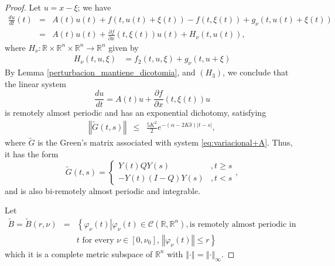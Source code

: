\documentclass[english,reqno]{amsart}
\numberwithin{equation}{section}
\theoremstyle{plain}
\theoremstyle{definition}
\theoremstyle{remark}
\begin{document}
\begin{proof}
Let $u=x-\xi$; we have
\begin{eqnarray}
\frac{du}{dt}\left(t\right) & = & A\left(t\right)u\left(t\right)+f\left(t,u\left(t\right)+\xi\left(t\right)\right)-f\left(t,\xi\left(t\right)\right)+ g_{\nu}\left(t,u\left(t\right)+\xi\left(t\right)\right) \label{traslado_Lipschitz} \\
 & = & A\left(t\right)u\left(t\right)+\frac{\partial f}{\partial x}\left(t,\xi\left(t\right)\right)u\left(t\right)+H_{\nu}\left(t,u\left(t\right)\right),\label{eq:trasladoentornovarphi0}
\end{eqnarray}
where $H_{\nu}:\mathbb{R}\times\mathbb{R}^n\times\mathbb{R}^n\rightarrow\mathbb{R}^n$ given by
\begin{align}
H_{\nu}\left(t,u,\xi\right) & = f_{2}\left(t,u,\xi\right)+ g_{\nu}\left(t,
u+\xi\right)\label{eq:H_v}
\end{align}
By Lemma \ref{perturbacion_mantiene_dicotomia}, and $\left(H_{3}\right)$, we conclude that the linear system 
\begin{equation}
\frac{du}{dt}=A\left(t\right)u+\frac{\partial f}{\partial x}\left(t,\xi\left(t\right)\right)u\label{eq:variacional+A}
\end{equation}
is remotely almost periodic and has an exponential dichotomy, satisfying
\begin{eqnarray*}
\left\Vert \tilde{G}\left(t,s\right)\right\Vert  & \leq & \frac{5K^{2}}{2}e^{-\left(\alpha-2K\delta\right)\left|t-s\right|},
\end{eqnarray*}
where $\tilde{G}$  is the Green's matrix associated with system \eqref{eq:variacional+A}. Thus, it has the form
\[
\tilde{G}\left(t,s\right)=\begin{cases}
Y\left(t\right)QY\left(s\right) & ,t\geq s\\
-Y\left(t\right)\left(I-Q\right)Y\left(s\right) & ,t< s
\end{cases},
\]
and is also bi-remotely almost periodic and integrable.

Let 
\begin{eqnarray*}
\widetilde{B}=\widetilde{B}\left(r,\nu\right) & = & \left\{ \varphi_{\nu}\left(t\right)\left|\varphi_{\nu}\left(t\right)\in\mathcal{C}\left(\mathbb{R},\mathbb{R}^{n}\right), \mbox{is remotely almost periodic in }\right.\right.\\
 &  & \left. t\mbox{ for every }\nu\in\left[0,\nu_{0}\right],\,\left\Vert \varphi_{\nu}\left(t\right)\right\Vert \leq r\right\} 
\end{eqnarray*}
which it is a complete metric subspace of $\mathbb{R}^{n}$ with $\left\Vert \cdot\right\Vert =\left\Vert \cdot\right\Vert _{\infty}$.


\end{proof}
\end{document}
